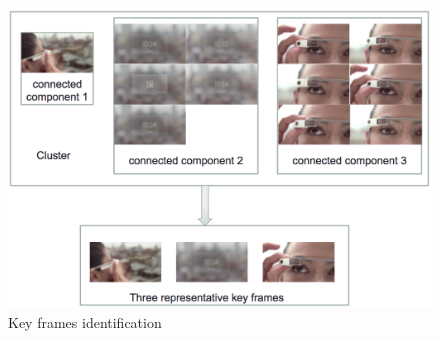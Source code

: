   \begin{figure}[!ht]
  \centering
    \includegraphics[scale = 0.6]{./keyFrames.png}
  \caption{Key frames identification}
  \end{figure}










